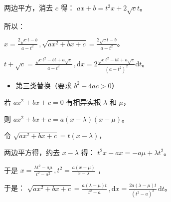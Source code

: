 两边平方，消去 $c$ 得： $ax+b=t^2x+2\sqrt{c}t$。

所以：

$\displaystyle{x=\frac{2\sqrt{c}t-b}{a-t^2}\,,\sqrt{ax^2+bx+c}=\frac{2\sqrt{c}t-b}{a-t^2}}$。

$\displaystyle{t+\sqrt{c}=\frac{\sqrt{c}t^2-bt+a\sqrt{c}}{a-t^2}\,,\mathrm{d}x=2\frac{\sqrt{c}t^2-bt+a\sqrt{c}}{(a-t^2)^2}\mathrm{d}t}$。

\begin{itemize}
\item 第三类替换（要求 $b^2-4ac>0$）
\end{itemize}
若 $ax^2+bx+c=0$ 有相异实根 $\lambda$ 和 $\mu$，

则 $ax^2+bx+c=a(x-\lambda)(x-\mu)$。

令 $\sqrt{ax^2+bx+c}=t(x-\lambda)$，

两边平方得，约去 $x-\lambda$ 得： $t^2x-ax=-a\mu+\lambda t^2$。

于是 $\displaystyle{x=\frac{\lambda t^2-a\mu}{t^2-a^2}\,,t^2=\frac{a(x-\mu)}{x-\lambda}}$ ，

于是： $\displaystyle{\sqrt{ax^2+bx+c}=\frac{a(\lambda-\mu)t}{t^2-a}\,,\mathrm{d}x=\frac{2a(\lambda-\mu)t}{(t^2-a)^2}\,\mathrm{d}t}$。
